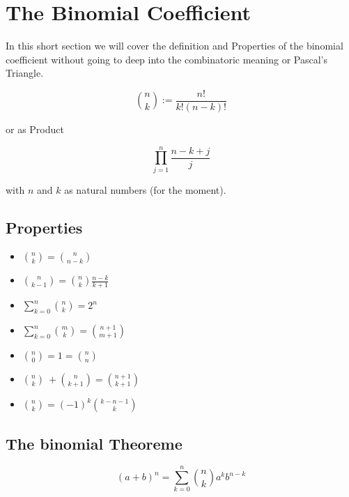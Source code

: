 \section{The Binomial Coefficient}
In this short section we will cover the definition and Properties of the binomial coefficient
without going to deep into the combinatoric meaning or Pascal's Triangle.

\[
\binom{n}{k} := \frac{n!}{k!(n-k)!}
\]

or as Product

\[
\prod_{j = 1}^{n} \frac{n-k+j}{j}
\]

with $n$ and $k$ as natural numbers (for the moment).

\subsection{Properties}

\begin{itemize}[label=$-$]
    \item \( \binom{n}{k} =  \binom{n}{n - k}\)
    \item \( \binom{n}{k - 1} = \binom{n}{k} \frac{n - k}{k + 1}\)
    \item \( \sum_{k = 0}^{n} \binom{n}{k} = 2^n\) 
    \item \( \sum_{k = 0}^{n} \binom{m}{k} = \binom{n + 1}{m + 1}\) 
    \item \(\binom{n}{0} = 1 = \binom{n}{n}\)
    \item \(\binom{n}{k}\ + \binom{n}{k + 1} = \binom{n + 1}{k + 1}\)
    \item \(\binom{n}{k} = (-1)^k \binom{k - n - 1}{k}\)
\end{itemize}

\subsection{The binomial Theoreme}
\[
    (a + b)^{n} =\sum_{k = 0}^{n}\binom{n}{k}a^k b^{n - k}
\]

\newpage


